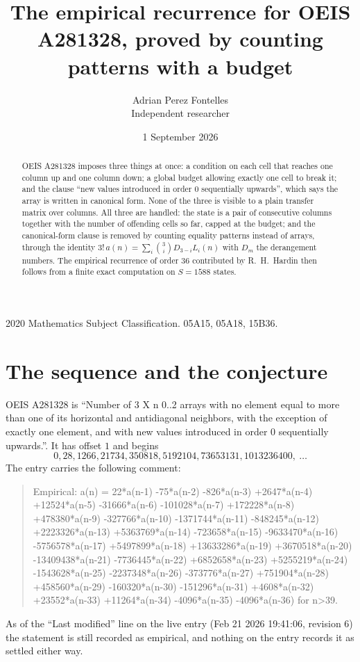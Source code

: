\documentclass[11pt,a4paper]{article}
\title{The empirical recurrence for OEIS A281328, proved by counting patterns with a budget}
\author{Adrian Perez Fontelles\\ \small Independent researcher}
\date{1 September 2026}
\theoremstyle{plain}
\theoremstyle{definition}
\begin{document}
\maketitle

\begin{abstract}
OEIS A281328 imposes three things at once: a condition on each cell that reaches one column up and
one column down; a global budget allowing exactly one cell to
break it; and the clause ``new values introduced in order $0$ sequentially upwards'', which
says the array is written in canonical form. None of the three is visible to a plain transfer
matrix over columns. All three are handled: the state is a pair of consecutive columns
together with the number of offending cells so far, capped at the budget; and the
canonical-form clause is removed by counting equality patterns instead of arrays, through the
identity $3!\,a(n)=\sum_i\binom{3}{i}D_{3-i}L_i(n)$ with $D_m$ the derangement
numbers. The empirical recurrence of order $36$ contributed by R.~H.~Hardin then follows
from a finite exact computation on $S=1588$ states.
\end{abstract}

\noindent\small 2020 Mathematics Subject Classification. 05A15, 05A18, 15B36.\normalsize

\section{The sequence and the conjecture}

OEIS A281328 is ``Number of 3 X n 0..2 arrays with no element equal to more than one of its horizontal and antidiagonal neighbors, with the exception of exactly one element, and with new values introduced in order 0 sequentially upwards.''. It has offset $1$ and begins
\[
0, 28, 1266, 21734, 350818, 5192104, 73653131, 1013236400,\ \dots
\]
The entry carries the following comment:
\begin{quote}\small
Empirical: a(n) = 22*a(n-1) -75*a(n-2) -826*a(n-3) +2647*a(n-4) +12524*a(n-5) -31666*a(n-6) -101028*a(n-7) +172228*a(n-8) +478380*a(n-9) -327766*a(n-10) -1371744*a(n-11) -848245*a(n-12) +2223326*a(n-13) +5363769*a(n-14) -723658*a(n-15) -9633470*a(n-16) -5756578*a(n-17) +5497899*a(n-18) +13633286*a(n-19) +3670518*a(n-20) -13409438*a(n-21) -7736445*a(n-22) +6852658*a(n-23) +5255219*a(n-24) -1543628*a(n-25) -2237348*a(n-26) -373776*a(n-27) +751904*a(n-28) +458560*a(n-29) -160320*a(n-30) -151296*a(n-31) +4608*a(n-32) +23552*a(n-33) +11264*a(n-34) -4096*a(n-35) -4096*a(n-36) for n>39.
\end{quote}
As of the ``Last modified'' line on the live entry (Feb 21 2026 19:41:06, revision 6) the statement is
still recorded as empirical, and nothing on the entry records it as settled either way.
\end{document}
